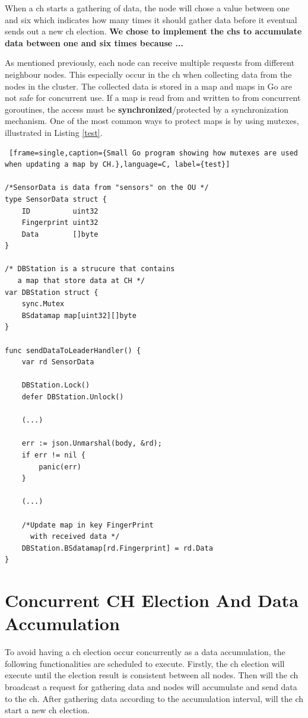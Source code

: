 \documentclass[USenglish]{uit-thesis}
\begin{document}
When a \gls{ch} starts a gathering of data, the node will chose a value between one and six which indicates how many times it should gather data before it eventual sends out a new \gls{ch} election. \textbf{We chose to implement the \gls{ch}s to accumulate data between one and six times because ...}


As mentioned previously, each node can receive multiple requests from different neighbour nodes.
This especially occur in the \gls{ch} when collecting data from the nodes in the cluster. The collected data is stored in a map and maps in Go are not safe for concurrent use. If a map is read from and written to from concurrent goroutines, the access must be \textbf{synchronized}/protected by a synchronization mechanism. One of the most common ways to protect maps is by using mutexes, illustrated in Listing \ref{test}.

\newpage

\begin{lstlisting} [frame=single,caption={Small Go program showing how mutexes are used when updating a map by CH.},language=C, label={test}]

/*SensorData is data from "sensors" on the OU */
type SensorData struct {
	ID          uint32
	Fingerprint uint32
	Data        []byte
}

/* DBStation is a strucure that contains 
   a map that store data at CH */
var DBStation struct {
	sync.Mutex
	BSdatamap map[uint32][]byte
}

func sendDataToLeaderHandler() {
	var rd SensorData
	
	DBStation.Lock()
	defer DBStation.Unlock()
	
	(...)
	
	err := json.Unmarshal(body, &rd); 
	if err != nil {
		panic(err)
	}
	
	(...)
	
	/*Update map in key FingerPrint
	  with received data */
	DBStation.BSdatamap[rd.Fingerprint] = rd.Data
}
\end{lstlisting}


\newpage

\section{Concurrent CH Election And Data Accumulation} \label{sec:conc_events}
To avoid having a \gls{ch} election occur concurrently as a data accumulation, the following functionalities are scheduled to execute.
Firstly, the \gls{ch} election will execute until the election result is consistent between all nodes. Then will the \gls{ch} broadcast a request for gathering data and nodes will accumulate and send data to the \gls{ch}. After gathering data according to the accumulation interval, will the \gls{ch} start a new \gls{ch} election. 
\end{document}
